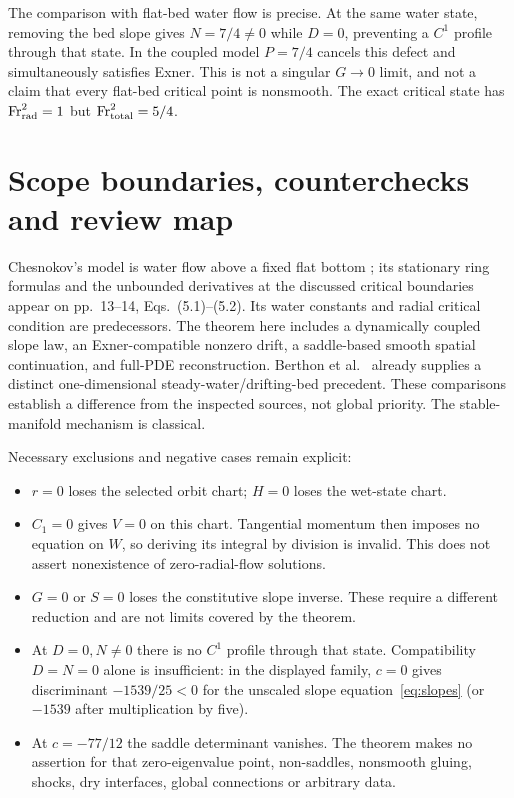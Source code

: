 \documentclass[11pt]{article}
\theoremstyle{remark}\newtheorem{remark}[theorem]{Remark}
\begin{document}
The comparison with flat-bed water flow is precise. At the same water state,
removing the bed slope gives $N=7/4\ne0$ while $D=0$, preventing a $C^1$
profile through that state. In the coupled model $P=7/4$ cancels this defect
and simultaneously satisfies Exner. This is not a singular $G\to0$ limit,
and not a claim that every flat-bed critical point is nonsmooth. The exact
critical state has $\mathrm{Fr}_{\rm rad}^2=1$ but
$\mathrm{Fr}_{\rm total}^2=5/4$.

\section{Scope boundaries, counterchecks and review map}
Chesnokov's model is water flow above a fixed flat bottom
\cite[p.~1, Eq.~(1.1)]{chesnokov}; its stationary ring formulas and the
unbounded derivatives at the discussed critical boundaries appear on
pp.~13--14, Eqs.~(5.1)--(5.2). Its water constants and radial critical condition
are predecessors. The theorem here includes a dynamically coupled slope law,
an Exner-compatible nonzero drift, a saddle-based smooth spatial continuation,
and full-PDE reconstruction. Berthon et al.~\cite[pp.~184--185]{berthon}
already supplies a distinct one-dimensional steady-water/drifting-bed
precedent. These comparisons establish a difference from the inspected
sources, not global priority. The stable-manifold mechanism is classical.

Necessary exclusions and negative cases remain explicit:
\begin{itemize}
\item $r=0$ loses the selected orbit chart; $H=0$ loses the wet-state chart.
\item $C_1=0$ gives $V=0$ on this chart. Tangential momentum then imposes
      no equation on $W$, so deriving its integral by division is invalid.
      This does not assert nonexistence of zero-radial-flow solutions.
\item $G=0$ or $S=0$ loses the constitutive slope inverse. These require a
      different reduction and are not limits covered by the theorem.
\item At $D=0,N\ne0$ there is no $C^1$ profile through that state.
      Compatibility $D=N=0$ alone is insufficient: in the displayed family,
      $c=0$ gives discriminant $-1539/25<0$ for the unscaled slope
      equation~\eqref{eq:slopes} (or $-1539$ after multiplication by five).
\item At $c=-77/12$ the saddle determinant vanishes. The theorem makes no
      assertion for that zero-eigenvalue point, non-saddles, nonsmooth gluing,
      shocks, dry interfaces, global connections or arbitrary data.
\end{itemize}
\end{document}
